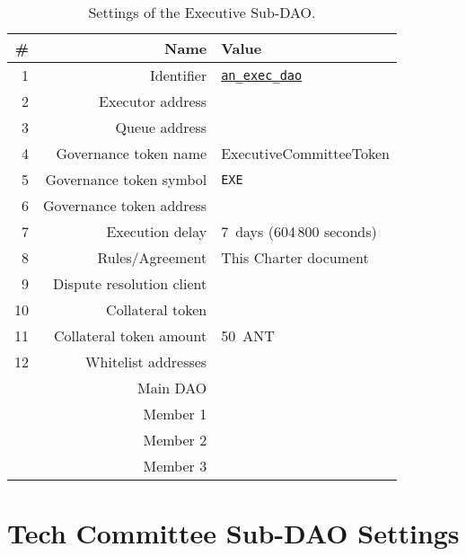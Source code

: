 \begin{table}[h!]
	\caption{Settings of the Executive Sub-DAO.}
	\centering
	\begin{tabular}{rrl}
		\toprule
		\# & Name & Value \\
		\midrule
		 1 & Identifier					& \href{https://govern.aragon.org/\#/daos/an_exec_dao}{\texttt{an\_exec\_dao}}\\
		 2 & Executor address			& \execSubDaoAddr\\
		 3 & Queue address				& \execSubDaoQueueAddr\\
		 4 & Governance token name		& ExecutiveCommitteeToken\\
		 5 & Governance token symbol	& \texttt{EXE}\\
		 6 & Governance token address	& \execSubDaoTokenAddr\\
		 7 & Execution delay			& 7~days (604\,800 seconds)\\
		 8 & Rules/Agreement			& This Charter document\\
		 9 & Dispute resolution client	& \aragonCourtAddr\\
		10 & Collateral token			& \antTokenAddr\\
		11 & Collateral token amount	& 50~\ac{ANT}\\
		12 & Whitelist addresses 		& \\
			& Main \ac{DAO}				& \mainDaoAddr\\
			& Member 1 					& \execSubDaoMemberAddrI\\
			& Member 2 					& \execSubDaoMemberAddrII\\
			& Member 3 					& \execSubDaoMemberAddrIII\\
		\bottomrule
	\end{tabular}
\end{table}

\clearpage

\section{Tech Committee Sub-DAO Settings}


